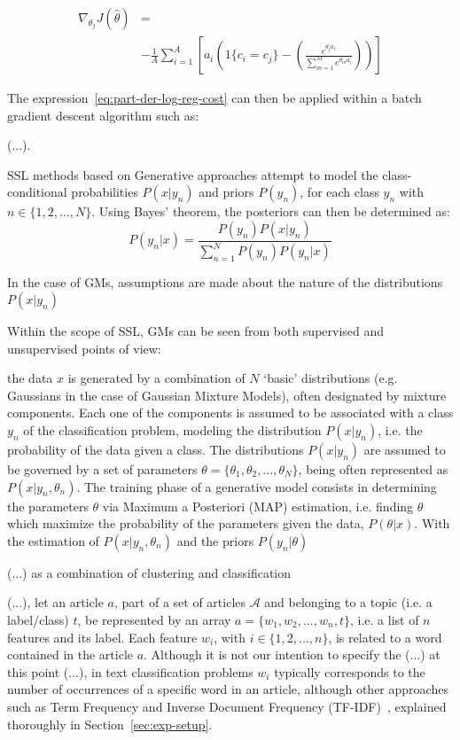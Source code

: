 \footnotesize
\begin{equation}
\begin{split}
    \nabla_{\theta_j}J(\hat{\theta}) &=\\ 
    &-\frac{1}{A}\sum_{i=1}^{A}\left[a_i\left(1\{c_{i} = c_{j}\} - \left(\frac{e^{\theta_j a_i}}{\sum_{m=1}^{M}e^{\theta_m a_i}}\right)\right)\right]
    \label{eq:part-der-log-reg-cost}
\end{split}
\end{equation}
\normalsize

The expression~\ref{eq:part-der-log-reg-cost} can then be applied within a 
batch gradient descent algorithm such as:

(...).

SSL methods based on Generative approaches attempt to model the 
class-conditional probabilities $P(x|y_n)$ and priors $P(y_n)$, for each 
class $y_n$ with $n \in \{1, 2, ..., N\}$. Using Bayes' theorem, the posteriors 
can then be determined as:
\[P(y_n|x) = \frac{P(y_n)P(x|y_n)}{\sum_{n=1}^{N}P(y_n)P(y_n|x)}\]

In the case of GMs, assumptions are made about the nature of the distributions 
$P(x|y_n)$


Within the scope of SSL, GMs can be seen from both supervised and unsupervised 
points of view: 




the data $x$ is 
generated by a combination of $N$ `basic' distributions (e.g. Gaussians in the 
case of Gaussian Mixture Models), often designated by mixture components. Each 
one of the components is assumed to be associated with a class $y_n$ of 
the classification problem, modeling the 
distribution $P(x|y_n)$, i.e. the probability of the data given a class. 
The distributions $P(x|y_n)$ are assumed to be governed by a set of parameters 
$\theta = \{\theta_1, \theta_2, ..., \theta_N\}$, being often represented as 
$P(x|y_n, \theta_n)$. The training phase of a generative model consists in 
determining the parameters $\theta$ via Maximum a Posteriori (MAP) estimation, 
i.e. finding $\theta$ which maximize the probability of the 
parameters given the data, $P(\theta|x)$. With the estimation of 
$P(x|y_n, \theta_n)$ and the priors $P(y_n|\theta)$

(...) as a combination of clustering and classification 


(...), let an article $a$, part of a set of articles $\mathcal{A}$ and 
belonging to a topic (i.e. a label\slash class) $t$, be represented by an 
array $a = \{w_{1}, w_{2}, ..., w_{n}, t\}$, i.e. a list of $n$ features 
and its label. Each feature $w_i$, with $i \in \{1,2, ..., n\}$, is related to a 
word contained in the article $a$. Although it is not our intention to specify 
the (...) at this 
point (...), in text classification problems $w_i$ typically corresponds to the 
number of occurrences of a specific word in an article, although other 
approaches such as Term Frequency and Inverse Document Frequency 
(TF-IDF)~\cite{Rennie03tacklingthe}, explained thoroughly in 
Section~\ref{sec:exp-setup}.\vertbreak


